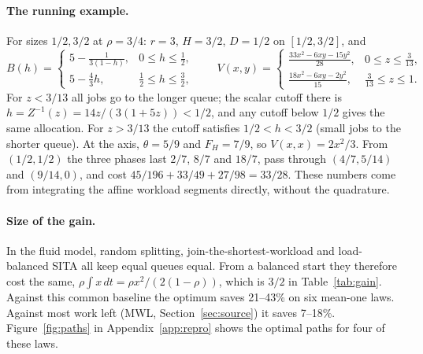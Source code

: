 \documentclass[11pt]{article}
\numberwithin{equation}{section}
\theoremstyle{definition}
\theoremstyle{remark}
\begin{document}
\paragraph{The running example.} For sizes $1/2,3/2$ at $\rho=3/4$: $r=3$, $H=3/2$, $D=1/2$ on $[1/2,3/2]$, and
\[
B(h)=\begin{cases}5-\frac1{3(1-h)},&0\le h\le\frac12,\\[0.5ex] 5-\frac43h,&\frac12\le h\le\frac32,\end{cases}\qquad
V(x,y)=\begin{cases}\frac{33x^2-6xy-15y^2}{28},&0\le z\le\frac3{13},\\[0.5ex]\frac{18x^2-6xy-2y^2}{15},&\frac3{13}\le z\le1.\end{cases}
\]
For $z<3/13$ all jobs go to the longer queue; the scalar cutoff there is $h=Z^{-1}(z)=14z/(3(1+5z))<1/2$, and any cutoff below $1/2$ gives the same allocation. For $z>3/13$ the cutoff satisfies $1/2<h<3/2$ (small jobs to the shorter queue). At the axis, $\theta=5/9$ and $F_H=7/9$, so $V(x,x)=2x^2/3$. From $(1/2,1/2)$ the three phases last $2/7$, $8/7$ and $18/7$, pass through $(4/7,5/14)$ and $(9/14,0)$, and cost $45/196+33/49+27/98=33/28$. These numbers come from integrating the affine workload segments directly, without the quadrature.

\paragraph{Size of the gain.} In the fluid model, random splitting, join-the-shortest-workload and load-balanced SITA all keep equal queues equal. From a balanced start they therefore cost the same, $\rho\int x\,dt=\rho x^2/(2(1-\rho))$, which is $3/2$ in Table~\ref{tab:gain}. Against this common baseline the optimum saves 21--43\% on six mean-one laws. Against most work left (MWL, Section~\ref{sec:source}) it saves 7--18\%. Figure~\ref{fig:paths} in Appendix~\ref{app:repro} shows the optimal paths for four of these laws.
\end{document}

